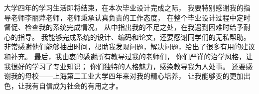\begin{thanks}

大学四年的学习生活即将结束，在本次毕业设计完成之际，
我要特别感谢我的指导老师李丽萍老师，老师秉承认真负责的工作态度，
在整个毕业设计过程中定时督促、检查我的系统完成情况，
从中指出我的不足之处，在我遇到困难时给予耐心的指导。
我能够完成系统的设计、编码和论文，还要感谢同学们的无私帮助。
非常感谢他们能够抽出时间，帮助我发现问题，解决问题，给出了很多有用的建议和补充。
最后，我由衷的感谢所有教导过我的老师们，
你们严谨的治学风格，让我很好的学习了专业知识；
你们独特的人格魅力，感染教导我为人处事。
还要感谢我的母校——上海第二工业大学四年来对我的精心培养，
让我能够变的更加出色，让我有自信成为社会的有用之才。

\end{thanks}
